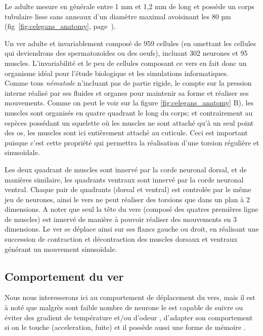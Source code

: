 
Le \celeg{} adulte mesure en générale entre 1 mm et 1,2 mm de long et
possède un corps tubulaire lisse sans anneaux d'un diamètre maximal
avoisinant les 80 µm (fig~\ref{fig:celegans_anatomy},
page~\pageref{fig:celegans_anatomy}).

Un ver adulte et invariablement composé de 959 cellules (en omettant les
cellules qui deviendrons des spermatozoïdes ou des oeufs), incluant 302
neurones et 95 muscles.  \cite{Boyle2009} L'invariabilité et le peu de
cellules composant ce vers en fait donc un organisme idéal pour l'étude
biologique et les simulations informatiques.\\


Comme tous \textit{nématode} n'incluant pas de partie rigide, le \celeg{}
compte sur la pression interne réalisé par ses fluides et organes pour
maintenir sa forme et réaliser ses mouvements.  Comme on peut le voir sur la
figure \ref{fig:celegans_anatomy} B), les muscles sont organisés en quatre
quadrant le long du corps; et contrairement au espèces possédant un
squelette où les muscles ne sont attaché qu'à un seul point des os, les
muscles sont ici entièrement attaché au cuticule. Ceci est important puisque
c'est cette propriété qui permettra la réalisation d'une torsion régulière
et sinusoïdale.

Les deux quadrant de muscles sont innervé par la corde neuronal dorsal, et de
manières similaire, les quadrants ventraux sont innervé par la corde neuronal
ventral. Chaque pair de quadrants (dorsal et ventral) est controlée par le même
jeu de neurones, ainsi le vers ne peut réaliser des torsions que dans un plan à
2 dimensions. A noter que seul la tête du vers (composé des quatres premières
ligne de muscles) est innervé de manière à pouvoir réaliser des mouvements en 3
dimensions. Le ver se déplace ainsi sur ses flancs gauche ou droit, en réalisant
une succession de contraction et décontraction des muscles dorsaux et ventraux
générant un mouvement sinusoïdale.


\subsection{Comportement du ver} %
\label{sub:Comportement du ver}

Nous nous interesserons ici au comportement de déplacement du vers, mais il est
à noté que malgrès sont faible nombre de neurone le \celeg{} est capable de
suivre ou éviter des gradient de température et/ou d'odeur
\cite{Ferree1999,Gray2005}, d'adapter son comportement si on le touche
(acceleration, fuite) \cite{Chalfie1985} et il possède aussi une forme de
mémoire \cite{Rankin2005a}.\\

